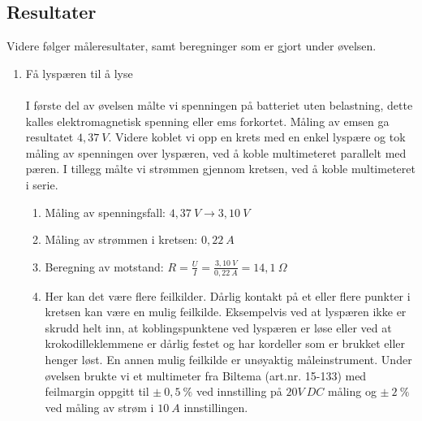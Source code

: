 \documentclass[norsk,11pt,a4paper]{report}
\newcommand{\oppgave}[2]{\item[#1:] #2}
\newcommand{\oppgaveDelStart}{\begin{enumerate}[leftmargin=*,itemsep=0.25cm,labelsep=1.5em,label=\alph*)]}
\newcommand{\oppgaveDelSlutt}{\end{enumerate}}
\newcommand{\oppgaveDel}[1]{\item[#1)]}
\begin{document}
\subsection*{Resultater}
Videre følger måleresultater, samt beregninger som er gjort under øvelsen.\\
\begin{enumerate}[itemsep=1cm]

\oppgave{1}{Få lyspæren til å lyse}\\\\
I første del av øvelsen målte vi spenningen på batteriet uten belastning, dette kalles elektromagnetisk spenning eller ems forkortet. Måling av emsen ga resultatet $4,37\ V$. Videre koblet vi opp en krets med en enkel lyspære og tok måling av spenningen over lyspæren, ved å koble multimeteret parallelt med pæren. I tillegg målte vi strømmen gjennom kretsen, ved å koble multimeteret i serie.
\oppgaveDelStart{}
\oppgaveDel{a} Måling av spenningsfall: $4,37\ V \rightarrow 3,10\ V$
\oppgaveDel{b} Måling av strømmen i kretsen: $0,22\ A$
\oppgaveDel{c} Beregning av motstand: $R = \frac{U}{I} = \frac{3,10\ V}{0,22\ A} = 14,1\ \Omega$
\oppgaveDel{d} Her kan det være flere feilkilder. Dårlig kontakt på et eller flere punkter i kretsen kan være en mulig feilkilde. Eksempelvis ved at lyspæren ikke er skrudd helt inn, at koblingspunktene ved lyspæren er løse eller ved at krokodilleklemmene er dårlig festet og har kordeller som er brukket eller henger løst. En annen mulig feilkilde er unøyaktig måleinstrument. Under øvelsen brukte vi et multimeter fra Biltema (art.nr. 15-133) med feilmargin oppgitt til $\pm\ 0,5\ \%$ ved innstilling på $20V\ DC$ måling og $\pm\ 2\ \%$ ved måling av strøm i $10\ A$ innstillingen.
\oppgaveDelSlutt{}

\newpage


\end{enumerate}
\end{document}

